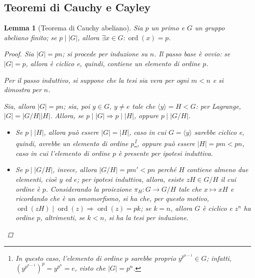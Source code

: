 \documentclass[11pt]{scrartcl}
\theoremstyle{style1}
\newtheorem{lemma}{Lemma}[teorema]
\numberwithin{equation}{subsection}
\begin{document}
\subsection{Teoremi di Cauchy e Cayley}
\begin{lemma}[Teorema di Cauchy abeliano]\label{cab}
	Sia $p$ un primo e $G$ un gruppo abeliano finito; se $p  \mid  |G|$, allora $\exists x \in G : \operatorname{ord}(x) =p$.
	\begin{proof}
		Sia $\lvert G \rvert = pn$; si procede per induzione su $n$.
		Il passo base \`e ovvio: se $\lvert G \rvert =p$, allora \`e ciclico e, quindi, contiene un elemento di ordine $p$.

		Per il passo induttivo, si suppone che la tesi sia vera per ogni $m < n$ e si dimostra per $n$.

		Sia, allora $\lvert G \rvert  = pn$; sia, poi $y \in G, \ y\neq e$ tale che $\langle y \rangle= H < G$: per Lagrange, $\lvert G \rvert  = \lvert G / H \rvert  \lvert H \rvert $.
		Allora, se $p  \mid \lvert G \rvert \Rightarrow  p  \mid \lvert H \rvert $, oppure $ p   \mid \lvert G / H \rvert $.
		\begin{itemize}
			\item Se $p  \mid \lvert H \rvert $, allora pu\`o essere $\lvert G \rvert  = \lvert H \rvert $, caso in cui $G = \langle y \rangle$ sarebbe ciclico e, quindi, avrebbe un elemento di ordine $p$\footnote{In questo caso, l'elemento di ordine $p$ sarebbe proprio $y^{p^{n-1} } \in G $; infatti, $(y^{p^{n-1} } )^p = y^{p^n} = e$, visto che $|G| = p^n$.}, oppure pu\`o essere $\lvert H \rvert  = pm < pn$, caso in cui l'elemento di ordine $p$ \`e presente per ipotesi induttiva.
			\item Se $p  \mid  \lvert G / H \rvert $, invece, allora $\lvert G / H \rvert = pm' < pn$ perch\'e $H$ contiene almeno due elementi, cio\`e $y$ ed $e$; per ipotesi induttiva, allora, esiste $zH \in G / H$ il cui ordine \`e $p$.
				Considerando la proiezione $\pi_H : G \to G / H$ tale che $x \mapsto xH$ e ricordando che \`e un omomorfismo, si ha che, per questo motivo, $\operatorname{ord}(zH)  \mid \operatorname{ord}(z)\Rightarrow \operatorname{ord}(z) = pk$; se $k = n$, allora $G$ \`e ciclico e $z^n$ ha ordine $p$, altrimenti, se $k<n$, si ha la tesi per induzione.
		\end{itemize}
	\end{proof}
\end{lemma}
\end{document}
